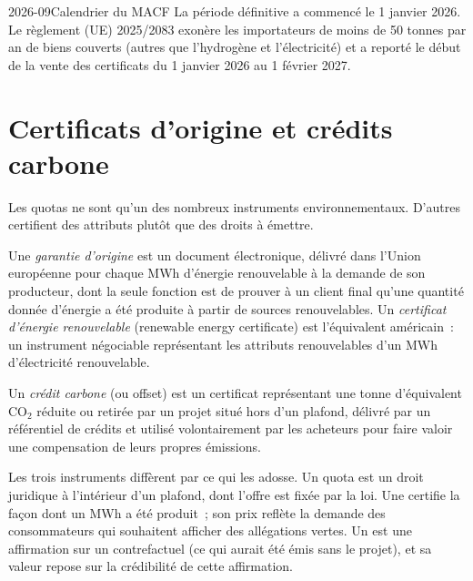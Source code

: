 \begin{dated}{2026-09}{Calendrier du MACF}\label{dat:m3:emissions-and-environmental-markets:cbam}
La période définitive a commencé le 1 janvier 2026. Le règlement (UE) 2025/2083 exonère les importateurs
de moins de 50 tonnes par an de biens couverts (autres que l'hydrogène et l'électricité) et a reporté le début
de la vente des certificats du 1 janvier 2026 au 1 février 2027.
\end{dated}

\section{Certificats d'origine et crédits carbone}

Les quotas ne sont qu'un des nombreux instruments environnementaux. D'autres certifient des attributs plutôt que
des droits à émettre.

\begin{definition}\label{def:m3:emissions-and-environmental-markets:go}
Une \emph{garantie d'origine} est un document électronique, délivré dans
l'Union européenne pour chaque MWh d'énergie renouvelable à la demande de son producteur, dont la
seule fonction est de prouver à un client final qu'une quantité donnée d'énergie a été produite à partir de sources renouvelables.
Un \emph{certificat d'énergie renouvelable} (renewable energy certificate) est l'équivalent américain~: un
instrument négociable représentant les attributs renouvelables d'un MWh d'électricité renouvelable.
\end{definition}

\begin{definition}\label{def:m3:emissions-and-environmental-markets:credit}
Un \emph{crédit carbone} (ou offset) est un certificat représentant une tonne
d'équivalent CO$_2$ réduite ou retirée par un projet situé hors d'un plafond, délivré par un référentiel de crédits et
utilisé volontairement par les acheteurs pour faire valoir une compensation de leurs propres émissions.
\end{definition}

Les trois instruments diffèrent par ce qui les adosse. Un quota est un droit juridique à l'intérieur d'un plafond, dont
l'offre est fixée par la loi. Une  certifie la façon dont un MWh a été produit~; son prix reflète
la demande des consommateurs qui souhaitent afficher des allégations vertes. Un  est une affirmation sur un contrefactuel (ce qui aurait été émis
sans le projet), et sa valeur repose sur la crédibilité de cette affirmation.

